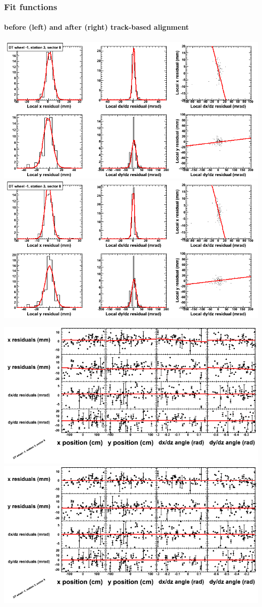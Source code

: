 \documentclass[compress]{beamer}
\begin{document}
\begin{frame}
\frametitle{Fit functions}
\framesubtitle{before (left) and after (right) track-based alignment}
\includegraphics[width=0.5\linewidth]{fitfunctions_re01/MBwhBst3sec08_bellcurves.png} \includegraphics[width=0.5\linewidth]{fitfunctions_re05/MBwhBst3sec08_bellcurves.png}

\includegraphics[width=0.5\linewidth]{fitfunctions_re01/MBwhBst3sec08_polynomials.png} \includegraphics[width=0.5\linewidth]{fitfunctions_re05/MBwhBst3sec08_polynomials.png}
\end{frame}
\end{document}
